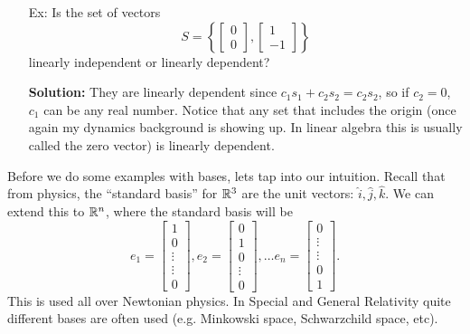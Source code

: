 \documentclass[reqno]{amsart}
\theoremstyle{definition}
\begin{document}
\begin{enumerate}
\pagebreak

\item[Ex:  ]  Is the set of vectors
%
\begin{equation*}
S = \left\lbrace\begin{bmatrix}
0\\
0
\end{bmatrix}, \begin{bmatrix}
1\\
-1
\end{bmatrix}\right\rbrace
\end{equation*}
%
linearly independent or linearly dependent?

\textbf{Solution:  }  They are linearly dependent since $c_1s_1 + c_2s_2 = c_2s_2$, so if
$c_2=0$, $c_1$ can be any real number.  Notice that any set that includes the origin (once
again my dynamics background is showing up.  In linear algebra this is usually called the
zero vector) is linearly dependent.
 
\end{enumerate}

\bigskip
\bigskip

Before we do some examples with bases, lets tap into our intuition.  Recall that from physics,
the ``standard basis'' for $\mathbb{R}^3$ are the unit vectors: $\hat{i}, \hat{j}, \hat{k}$.  We can
extend this to $\mathbb{R}^n$, where the standard basis will be
%
\begin{equation}
e_1 = \begin{bmatrix}
1\\
0\\
\vdots\\
\vdots\\
0
\end{bmatrix}, e_2 = \begin{bmatrix}
0\\
1\\
0\\
\vdots\\
0
\end{bmatrix}, \ldots e_n = \begin{bmatrix}
0\\
\vdots\\
\vdots\\
0\\
1
\end{bmatrix}.
\end{equation}
%
This is used all over Newtonian physics.  In Special and General Relativity quite different
bases are often used (e.g. Minkowski space, Schwarzchild space, etc).
\end{document}
